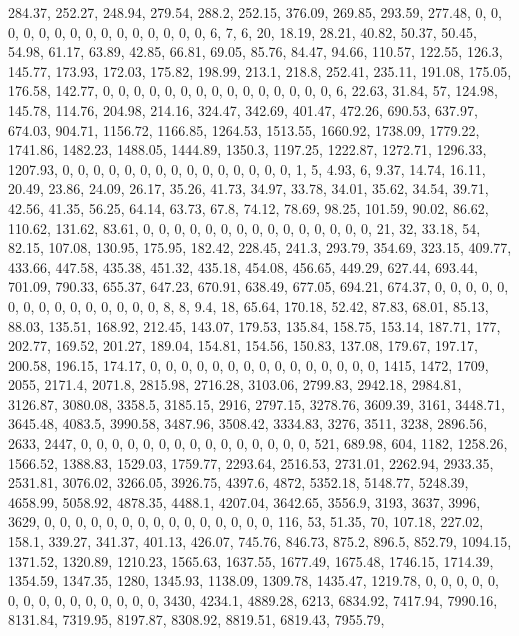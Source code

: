 \documentclass[
]{article}
\begin{document}
284.37, 252.27, 248.94, 279.54, 288.2, 252.15, 376.09, 269.85, 293.59,
277.48, 0, 0, 0, 0, 0, 0, 0, 0, 0, 0, 0, 0, 0, 0, 0, 6, 7, 6, 20, 18.19,
28.21, 40.82, 50.37, 50.45, 54.98, 61.17, 63.89, 42.85, 66.81, 69.05,
85.76, 84.47, 94.66, 110.57, 122.55, 126.3, 145.77, 173.93, 172.03,
175.82, 198.99, 213.1, 218.8, 252.41, 235.11, 191.08, 175.05, 176.58,
142.77, 0, 0, 0, 0, 0, 0, 0, 0, 0, 0, 0, 0, 0, 0, 0, 6, 22.63, 31.84,
57, 124.98, 145.78, 114.76, 204.98, 214.16, 324.47, 342.69, 401.47,
472.26, 690.53, 637.97, 674.03, 904.71, 1156.72, 1166.85, 1264.53,
1513.55, 1660.92, 1738.09, 1779.22, 1741.86, 1482.23, 1488.05, 1444.89,
1350.3, 1197.25, 1222.87, 1272.71, 1296.33, 1207.93, 0, 0, 0, 0, 0, 0,
0, 0, 0, 0, 0, 0, 0, 0, 0, 1, 5, 4.93, 6, 9.37, 14.74, 16.11, 20.49,
23.86, 24.09, 26.17, 35.26, 41.73, 34.97, 33.78, 34.01, 35.62, 34.54,
39.71, 42.56, 41.35, 56.25, 64.14, 63.73, 67.8, 74.12, 78.69, 98.25,
101.59, 90.02, 86.62, 110.62, 131.62, 83.61, 0, 0, 0, 0, 0, 0, 0, 0, 0,
0, 0, 0, 0, 0, 0, 21, 32, 33.18, 54, 82.15, 107.08, 130.95, 175.95,
182.42, 228.45, 241.3, 293.79, 354.69, 323.15, 409.77, 433.66, 447.58,
435.38, 451.32, 435.18, 454.08, 456.65, 449.29, 627.44, 693.44, 701.09,
790.33, 655.37, 647.23, 670.91, 638.49, 677.05, 694.21, 674.37, 0, 0, 0,
0, 0, 0, 0, 0, 0, 0, 0, 0, 0, 0, 0, 8, 8, 9.4, 18, 65.64, 170.18, 52.42,
87.83, 68.01, 85.13, 88.03, 135.51, 168.92, 212.45, 143.07, 179.53,
135.84, 158.75, 153.14, 187.71, 177, 202.77, 169.52, 201.27, 189.04,
154.81, 154.56, 150.83, 137.08, 179.67, 197.17, 200.58, 196.15, 174.17,
0, 0, 0, 0, 0, 0, 0, 0, 0, 0, 0, 0, 0, 0, 0, 1415, 1472, 1709, 2055,
2171.4, 2071.8, 2815.98, 2716.28, 3103.06, 2799.83, 2942.18, 2984.81,
3126.87, 3080.08, 3358.5, 3185.15, 2916, 2797.15, 3278.76, 3609.39,
3161, 3448.71, 3645.48, 4083.5, 3990.58, 3487.96, 3508.42, 3334.83,
3276, 3511, 3238, 2896.56, 2633, 2447, 0, 0, 0, 0, 0, 0, 0, 0, 0, 0, 0,
0, 0, 0, 0, 521, 689.98, 604, 1182, 1258.26, 1566.52, 1388.83, 1529.03,
1759.77, 2293.64, 2516.53, 2731.01, 2262.94, 2933.35, 2531.81, 3076.02,
3266.05, 3926.75, 4397.6, 4872, 5352.18, 5148.77, 5248.39, 4658.99,
5058.92, 4878.35, 4488.1, 4207.04, 3642.65, 3556.9, 3193, 3637, 3996,
3629, 0, 0, 0, 0, 0, 0, 0, 0, 0, 0, 0, 0, 0, 0, 0, 116, 53, 51.35, 70,
107.18, 227.02, 158.1, 339.27, 341.37, 401.13, 426.07, 745.76, 846.73,
875.2, 896.5, 852.79, 1094.15, 1371.52, 1320.89, 1210.23, 1565.63,
1637.55, 1677.49, 1675.48, 1746.15, 1714.39, 1354.59, 1347.35, 1280,
1345.93, 1138.09, 1309.78, 1435.47, 1219.78, 0, 0, 0, 0, 0, 0, 0, 0, 0,
0, 0, 0, 0, 0, 0, 3430, 4234.1, 4889.28, 6213, 6834.92, 7417.94,
7990.16, 8131.84, 7319.95, 8197.87, 8308.92, 8819.51, 6819.43, 7955.79,
\end{document}
